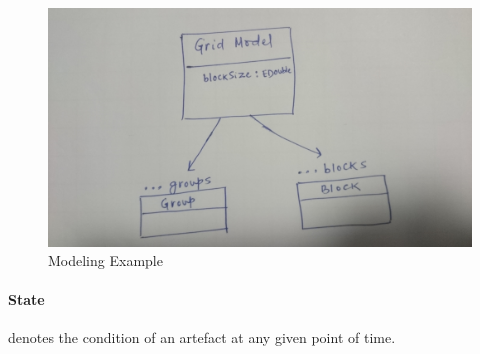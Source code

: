 \begin{figure}
	\includegraphics[width=1\textwidth]{figures/Modeling_Example}
	\caption{Modeling Example}
	\label{fig:Modeling_Example}
\end{figure}

\paragraph{State} denotes the condition of an artefact at any given point of time.

